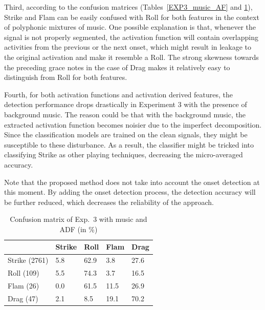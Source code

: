 \documentclass{article}
\begin{document}
Third, according to the confusion matrices (Tables~\ref{EXP3_music_AF} and \ref{EXP3_music_ADF}), Strike and Flam can be easily confused with Roll for both features in the context of polyphonic mixtures of music. One possible explanation is that, whenever the signal is not properly segmented, the activation function will contain overlapping activities from the previous or the next onset, which might result in leakage to the original activation and make it resemble a Roll. The strong skewness towards the preceding grace notes in the case of Drag makes it relatively easy to distinguish from Roll for both features.  

Fourth, for both activation functions and activation derived features, the detection performance drops drastically in Experiment 3 with the presence of background music. The reason could be that with the background music, the extracted activation function becomes noisier due to the imperfect decomposition. Since the classification models are trained on the clean signals, they might be susceptible to these disturbance. As a result, the classifier might be tricked into classifying Strike as other playing techniques, decreasing the micro-averaged accuracy. 

Note that the proposed method does not take into account the onset detection at this moment. By adding the onset detection process, the detection accuracy will be further reduced, which decreases the reliability of the approach. 

\begin{table}[]
\centering
\begin{tabular}{l|llll}
      & Strike & Roll & Flam & Drag \\ \hline
Strike (2761) & 5.8    & 62.9 & 3.8  & 27.6 \\
Roll (109)  & 5.5    & 74.3 & 3.7  & 16.5 \\
Flam (26)  & 0.0    & 61.5 & 11.5 & 26.9 \\
Drag (47)  & 2.1    & 8.5  & 19.1 & 70.2
\end{tabular}
\caption{Confusion matrix of Exp.~3 with music and ADF (in \%)}
\label{EXP3_music_ADF}
\end{table}
\end{document}
